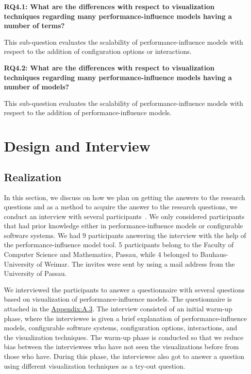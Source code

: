 \begin{mdframed}
\textbf{RQ4.1: What are the differences with respect to visualization techniques regarding many performance-influence models having a number of terms?}
\end{mdframed}

This sub-question evaluates the scalability of performance-influence models with respect to the addition of configuration options or interactions.

\begin{mdframed}
\textbf{RQ4.2: What are the differences with respect to visualization techniques regarding many performance-influence models having a number of models?}
\end{mdframed}

This sub-question evaluates the scalability of performance-influence models with respect to the addition of performance-influence models.

\section{Design and Interview}
\label{sec:3.2}
\subsection{Realization}

In this section, we discuss on how we plan on getting the answers to the research questions and as a method to acquire the answer to the research questions, we conduct an interview with several participants~\cite{dillman2014internet}. We only considered participants that had prior knowledge either in performance-influence models or configurable software systems. We had 9 participants answering the interview with the help of the performance-influence model tool. 
5 participants belong to the Faculty of Computer Science and Mathematics, Passau, while 4 belonged to Bauhaus-University of Weimar. The invites were sent by using a mail address from the University of Passau.

We interviewed the participants to answer a questionnaire with several questions based on visualization of performance-influence models. The questionnaire is attached in the 
\hyperref[appendix:questionnaire]{Appendix:A.3}. The interview consisted of an initial warm-up phase, where the interviewee is given a brief explanation of performance-influence models, configurable software systems, configuration options, interactions, and the visualization techniques. The warm-up phase is conducted so that we reduce bias between the interviewees who have not seen the visualizations before from those who have. During this phase, the interviewee also got to answer a question using different visualization techniques as a try-out question.


